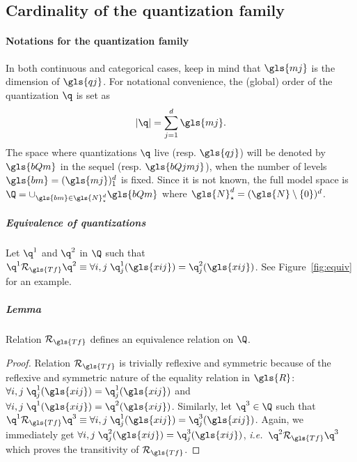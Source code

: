\subsection{Cardinality of the quantization family} \label{subsec:cardinality_quant}

\paragraph{Notations for the quantization family}

In both continuous and categorical cases, keep in mind that $\gls{mj}$ is the dimension of $\gls{qj}$. For notational convenience, the (global) order of the quantization $\q$ is set as 
\[|\q|=\sum_{j=1}^d \gls{mj}.\]
The space where quantizations $\q$ live (resp. $\gls{qj}$) will be denoted by $\gls{bQm}$ in the sequel (resp. $\gls{bQjmj}$), when the number of levels $\gls{bm} = (\gls{mj})_1^d$ is fixed. Since it is not known, the full model space is $\Q = \cup_{\gls{bm} \in \gls{N}_\star^{d}} \gls{bQm}$ where $\gls{N}_\star^{d} = (\gls{N} \setminus \{0\})^d$.

\subparagraph{Equivalence of quantizations} \label{par:equiv}

Let $\q^1$ and $\q^2$ in $\Q$ such that $\q^1 \mathcal{R}_{\gls{Tf}} \q^2 \equiv \forall i,j \; \q^1_j(\gls{xij}) = \q^2_j(\gls{xij})$. See Figure~\ref{fig:equiv} for an example.

\subparagraph{Lemma} Relation $\mathcal{R}_{\gls{Tf}}$ defines an equivalence relation on $\Q$.

\begin{proof}
Relation $\mathcal{R}_{\gls{Tf}}$ is trivially reflexive and symmetric because of the reflexive and symmetric nature of the equality relation in $\gls{R}$: $\forall i,j \; \q^1_j(\gls{xij}) = \q^1_j(\gls{xij})$ and $\forall i,j \; \q^1(\gls{xij}) = \q^2(\gls{xij})$. Similarly, let $\q^3 \in \Q$ such that $\q^1 \mathcal{R}_{\gls{Tf}} \q^3  \equiv \forall i,j \; \q^1_j(\gls{xij}) = \q^3_j(\gls{xij})$. Again, we immediately get $\forall i,j \; \q^2_j(\gls{xij}) = \q^3_j(\gls{xij})$, \textit{i.e.}\ $\q^2 \mathcal{R}_{\gls{Tf}} \q^3$ which proves the transitivity of $\mathcal{R}_{\gls{Tf}}$.
\end{proof}

